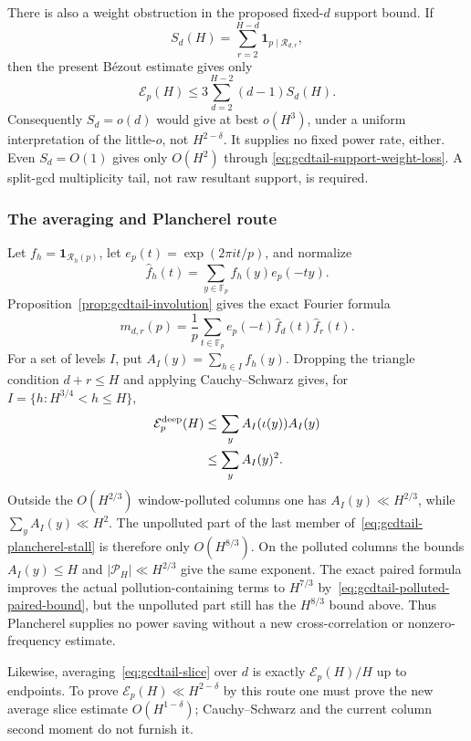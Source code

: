 There is also a weight obstruction in the proposed fixed-$d$ support
bound.  If
\[
 S_d(H)=\sum_{r=2}^{H-d}\mathbf1_{p\mid\mathcal R_{d,r}},
\]
then the present B\'ezout estimate gives only
\begin{equation}\label{eq:gcdtail-support-weight-loss}
 \mathcal E_p(H)\leq3\sum_{d=2}^{H-2}(d-1)S_d(H).
\end{equation}
Consequently $S_d=o(d)$ would give at best $o(H^3)$, under a uniform
interpretation of the little-$o$, not $H^{2-\delta}$.  It supplies no
fixed power rate, either.  Even $S_d=O(1)$ gives only $O(H^2)$ through
\eqref{eq:gcdtail-support-weight-loss}.  A split-gcd multiplicity tail,
not raw resultant support, is required.

\subsubsection{The averaging and Plancherel route}

Let $f_h=\mathbf1_{\mathscr R_h(p)}$, let
$e_p(t)=\exp(2\pi it/p)$, and normalize
\[
 \widehat f_h(t)=\sum_{y\in\mathbb F_p}f_h(y)e_p(-ty).
\]
Proposition~\ref{prop:gcdtail-involution} gives the exact Fourier formula
\begin{equation}\label{eq:gcdtail-fourier}
 m_{d,r}(p)=\frac1p\sum_{t\in\mathbb F_p}
 e_p(-t)\widehat f_d(t)\widehat f_r(t).
\end{equation}
For a set of levels $I$, put $A_I(y)=\sum_{h\in I}f_h(y)$.  Dropping the
triangle condition $d+r\leq H$ and applying Cauchy--Schwarz gives, for
$I=\{h:H^{3/4}<h\leq H\}$,
\begin{align}
 \mathcal E_p^{\rm deep}(H)
 &\leq\sum_y A_I(\iota(y))A_I(y)\notag\\
 &\leq\sum_y A_I(y)^2.                 \label{eq:gcdtail-plancherel-stall}
\end{align}
Outside the $O(H^{2/3})$ window-polluted columns one has
$A_I(y)\ll H^{2/3}$, while $\sum_yA_I(y)\ll H^2$.  The unpolluted part of
the last member of~\eqref{eq:gcdtail-plancherel-stall} is therefore only
$O(H^{8/3})$.  On the polluted columns the bounds
$A_I(y)\leq H$ and $|\mathcal P_H|\ll H^{2/3}$ give the same exponent.
The exact paired formula improves the actual pollution-containing terms
to $H^{7/3}$ by~\eqref{eq:gcdtail-polluted-paired-bound}, but the
unpolluted part still has the $H^{8/3}$ bound above.  Thus Plancherel
supplies no power saving without a new cross-correlation or
nonzero-frequency estimate.

Likewise, averaging~\eqref{eq:gcdtail-slice} over $d$ is exactly
$\mathcal E_p(H)/H$ up to endpoints.  To prove
$\mathcal E_p(H)\ll H^{2-\delta}$ by this route one must prove the new
average slice estimate $O(H^{1-\delta})$; Cauchy--Schwarz and the current
column second moment do not furnish it.

